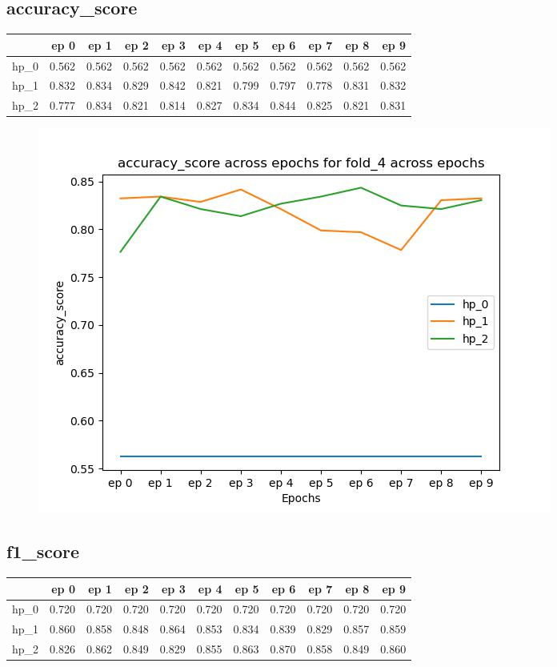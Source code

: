 \documentclass{article}
\begin{document}
\subsection{accuracy\_score}
\begin{tabular}{lrrrrrrrrrr}
\toprule
{} &   ep 0 &   ep 1 &   ep 2 &   ep 3 &   ep 4 &   ep 5 &   ep 6 &   ep 7 &   ep 8 &   ep 9 \\
\midrule
hp\_0 &  0.562 &  0.562 &  0.562 &  0.562 &  0.562 &  0.562 &  0.562 &  0.562 &  0.562 &  0.562 \\
hp\_1 &  0.832 &  0.834 &  0.829 &  0.842 &  0.821 &  0.799 &  0.797 &  0.778 &  0.831 &  0.832 \\
hp\_2 &  0.777 &  0.834 &  0.821 &  0.814 &  0.827 &  0.834 &  0.844 &  0.825 &  0.821 &  0.831 \\
\bottomrule
\end{tabular}

\begin{figure}[H]
\includegraphics[scale = 0.75]{fold_4/accuracy_score}
\end{figure}
\subsection{f1\_score}
\begin{tabular}{lrrrrrrrrrr}
\toprule
{} &   ep 0 &   ep 1 &   ep 2 &   ep 3 &   ep 4 &   ep 5 &   ep 6 &   ep 7 &   ep 8 &   ep 9 \\
\midrule
hp\_0 &  0.720 &  0.720 &  0.720 &  0.720 &  0.720 &  0.720 &  0.720 &  0.720 &  0.720 &  0.720 \\
hp\_1 &  0.860 &  0.858 &  0.848 &  0.864 &  0.853 &  0.834 &  0.839 &  0.829 &  0.857 &  0.859 \\
hp\_2 &  0.826 &  0.862 &  0.849 &  0.829 &  0.855 &  0.863 &  0.870 &  0.858 &  0.849 &  0.860 \\
\bottomrule
\end{tabular}
\end{document}
